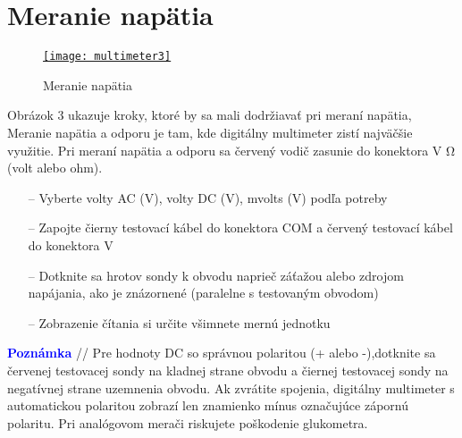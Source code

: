 \documentclass[10pt]{article}
\begin{document}
\section{Meranie napätia}
\begin{wrapfigure}{r}{0.25\textwidth}
\vspace*{-0.5cm}
\href{https://crushtymks.com/images/electrical-lectures/basic-measuring-of-resistance-voltage-and-current-using-digital-multimeter_3.jpg}{\texttt{[image: multimeter3]}}
\centering
\caption{Meranie napätia}
\end{wrapfigure}
Obrázok 3 ukazuje kroky, ktoré by sa mali dodržiavať pri meraní napätia, Meranie napätia a odporu je tam, kde digitálny multimeter zistí najväčšie využitie.
Pri meraní napätia a odporu sa červený vodič zasunie do konektora V \si{\ohm} (volt alebo ohm).
\begin{itemize}
   \item[--] Vyberte volty AC (V), volty DC (V), mvolts (V) podľa potreby
   \item[--] Zapojte čierny testovací kábel do konektora COM a červený testovací kábel do konektora V
   \item[--] Dotknite sa hrotov sondy k obvodu naprieč záťažou alebo zdrojom napájania, ako je znázornené (paralelne s testovaným obvodom)
   \item[--] Zobrazenie čítania si určite všimnete mernú jednotku
\end{itemize}
\textcolor{blue}{\textbf{Poznámka}} // Pre hodnoty DC so správnou polaritou (+ alebo -),dotknite sa červenej testovacej sondy na kladnej strane obvodu a čiernej testovacej sondy na negatívnej strane uzemnenia obvodu. Ak zvrátite spojenia, digitálny multimeter s automatickou polaritou zobrazí len znamienko mínus označujúce zápornú polaritu. Pri analógovom merači riskujete poškodenie glukometra.

\hfill \break
\hfill \break
\hfill \break
\hfill \break
\hfill \break
\hfill \break
\hfill \break
\end{document}
